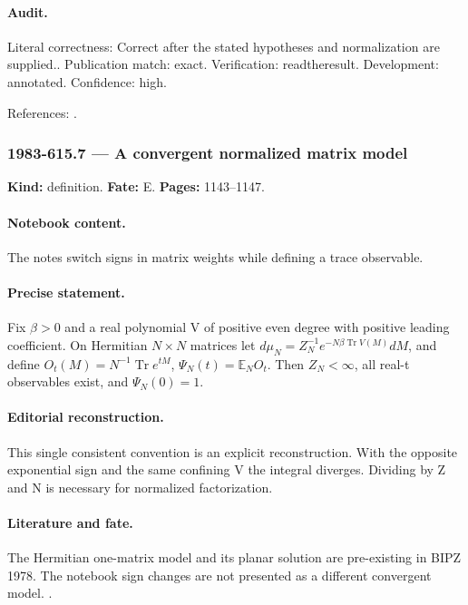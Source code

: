 \paragraph{Audit.} Literal correctness: Correct after the stated hypotheses and normalization are supplied.. Publication match: exact. Verification: readtheresult. Development: annotated. Confidence: high.

\noindent References: \citep{brezinitzyksonparisizuber1978planar}.\par

\subsubsection{1983-615.7 --- A convergent normalized matrix model}

\label{item:1983-615.7}

\noindent\textbf{Kind:} definition. \textbf{Fate:} E. \textbf{Pages:} 1143--1147.\par

\paragraph{Notebook content.} The notes switch signs in matrix weights while defining a trace observable.

\paragraph{Precise statement.} Fix $\beta>0$ and a real polynomial V of positive even degree with positive leading coefficient. On Hermitian $N\times N$ matrices let $d\mu_N=Z_N^{-1}e^{-N\beta\operatorname{Tr}V(M)}dM$, and define $O_t(M)=N^{-1}\operatorname{Tr}e^{tM}$, $\Psi_N(t)=\mathbb E_N O_t$. Then $Z_N<\infty$, all real-t observables exist, and $\Psi_N(0)=1$.

\paragraph{Editorial reconstruction.} This single consistent convention is an explicit reconstruction. With the opposite exponential sign and the same confining V the integral diverges. Dividing by Z and N is necessary for normalized factorization.

\paragraph{Literature and fate.} The Hermitian one-matrix model and its planar solution are pre-existing in BIPZ 1978. The notebook sign changes are not presented as a different convergent model. \citep{brezinitzyksonparisizuber1978planar}.

